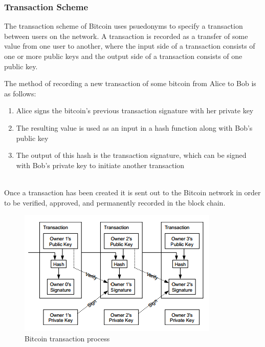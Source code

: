 \documentclass[11pt]{article}
\begin{document}
\subsubsection{Transaction Scheme}
The transaction scheme of Bitcoin uses psuedonyms to specify a transaction
between users on the network. A transaction is recorded as a transfer of some
value from one user to another, where the input side of a transaction consists
of one or more public keys and the output side of a transaction consists of one
public key.
\vspace{1em}\\
\begin{minipage}{\linewidth}
The method of recording a new transaction of some bitcoin from Alice to Bob
is as follows:
\begin{enumerate}
    \item Alice signs the bitcoin's previous transaction signature with her
        private key
    \item The resulting value is used as an input in a hash function along
        with Bob's public key
    \item The output of this hash is the transaction signature, which can be
        signed with Bob's private key to initiate another transaction
\end{enumerate}
\end{minipage}
\vspace{1em}\\

Once a transaction has been created it is sent out to the Bitcoin network in
order to be verified, approved, and permanently recorded in the block chain.

\begin{figure}[H]
    \centering
    \caption[Bitcoin transaction process]{Bitcoin transaction process~\cite{nakamoto08}}
    \includegraphics[width=.9\textwidth]{figures/transaction.png}
\end{figure}
\end{document}
